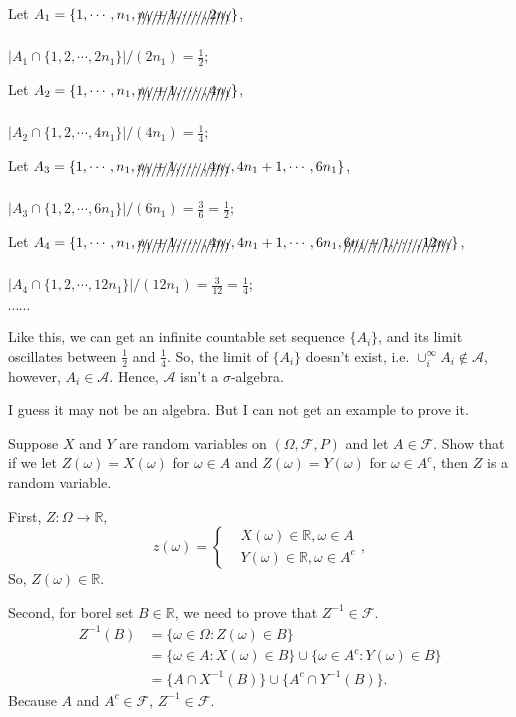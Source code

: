 \documentclass[en, normal, 11pt, black]{elegantnote}
\newenvironment{exercise}[1]{\begin{tcolorbox}[colback=black!15, colframe=black!80, breakable, title=#1]}{\end{tcolorbox}}
\renewenvironment{proof}{\begin{tcolorbox}[colback=white, colframe=black!50, breakable, title=Proof. ]\setlength{\parskip}{0.8em}}{\\\rightline{$\square$}\end{tcolorbox}}
\newenvironment{solution}{\begin{tcolorbox}[colback=white, colframe=black!50, breakable, title=Solution. ]\setlength{\parskip}{0.8em}}{\end{tcolorbox}}
\begin{document}
    \begin{solution}
        Let $A_1=\{1,\cdots,n_1, \xout{n_1+1, \cdots, 2n_1}\}$, 
        
        $|A_1 \cap\{1,2, \cdots, 2n_1\}| / (2n_1)=\frac{1}{2}$; 
        
        Let $A_2=\{1,\cdots,n_1,\xout{n_1+1, \cdots, 4n_1}\}$, 
        
        $|A_2 \cap\{1,2, \cdots, 4n_1\}| / (4n_1)=\frac{1}{4}$; 

        Let $A_3=\{1,\cdots,n_1,\xout{n_1+1, \cdots, 4n_1}, 4n_1+1, \cdots, 6n_1\}$, 
        
        $|A_3 \cap\{1,2, \cdots, 6n_1\}| / (6n_1)=\frac{3}{6}=\frac{1}{2}$; 

        Let $A_4=\{1,\cdots,n_1,\xout{n_1+1, \cdots, 4n_1}, 4n_1+1, \cdots, 6n_1,\xout{6n_1+1, \cdots, 12n_1}\}$, 
        
        $|A_4 \cap\{1,2, \cdots, 12n_1\}| / (12n_1)=\frac{3}{12}=\frac{1}{4}$; 

        $\cdots\cdots$

        Like this, we can get an infinite countable set sequence $\{A_i\}$, and its limit oscillates between $\frac{1}{2}$ and $\frac{1}{4}$. So, the limit of $\{A_i\}$ doesn't exist, i.e. $\cup_i^\infty A_i\not\in\mathcal{A}$, however, $A_i\in \mathcal{A}$. Hence, $\mathcal{A}$ isn't a $\sigma$-algebra. 

        I guess it may not be an algebra. But I can not get an example to prove it. 
    \end{solution}

    \begin{exercise}{1.2.1}
        Suppose $X$ and $Y$ are random variables on $(\Omega, \mathcal{F}, P)$ and let $A \in \mathcal{F}$. Show that if we let $Z(\omega)=X(\omega)$ for $\omega \in A$ and $Z(\omega)=Y(\omega)$ for $\omega \in A^{c}$, then $Z$ is a random variable.
    \end{exercise}
    \begin{proof}
        First, $Z: \Omega\to\mathbb{R}$, 
        \begin{equation*}
            z(\omega)=\left\{
            \begin{aligned}
                &X(\omega)\in\mathbb{R}, \omega\in A\\
                &Y(\omega)\in\mathbb{R}, \omega\in A^c
            \end{aligned}
            \right., 
        \end{equation*}
        So, $Z(\omega)\in\mathbb{R}$. 

        Second, for borel set $B\in\mathbb{R}$, we need to prove that $Z^{-1}\in\mathcal{F}$. 
        \begin{align*}
            Z^{-1}(B)&=\{\omega\in\Omega:Z(\omega)\in B\}\\
            &=\{\omega\in A: X(\omega)\in B\}\cup\{\omega\in A^c: Y(\omega)\in B\}\\
            &=\{A\cap X^{-1}(B)\}\cup\{A^c\cap Y^{-1}(B)\}. 
        \end{align*}
        Because $A$ and $A^c\in\mathcal{F}$, $Z^{-1}\in\mathcal{F}$. 
    \end{proof}
\end{document}
